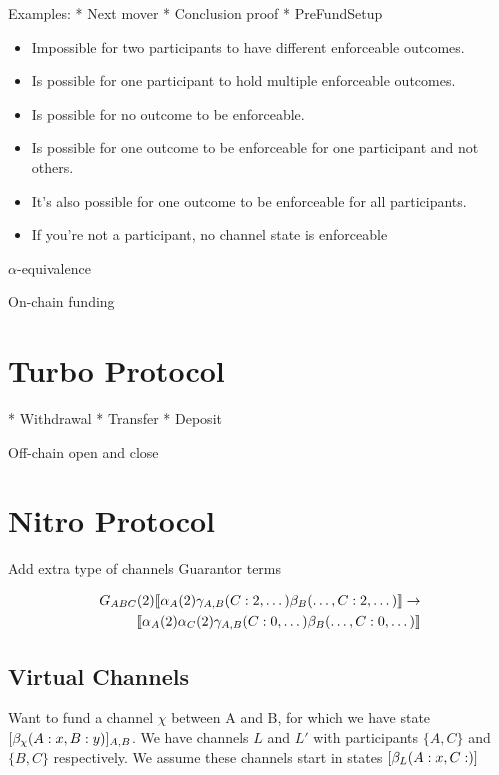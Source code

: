Examples:
* Next mover
* Conclusion proof
* PreFundSetup

\begin{itemize}
  \item Impossible for two participants to have different enforceable outcomes.
  \item Is possible for one participant to hold multiple enforceable outcomes.
  \item Is possible for no outcome to be enforceable.
  \item Is possible for one outcome to be enforceable for one participant and not others.
  \item It's also possible for one outcome to be enforceable for all participants.
  \item If you're not a participant, no channel state is enforceable
\end{itemize}

$\alpha$-equivalence

On-chain funding

\section{Turbo Protocol}

* Withdrawal
* Transfer
* Deposit

Off-chain open and close


\section{Nitro Protocol}

Add extra type of channels
Guarantor terms

\begin{align*}
G_{ABC}(2) \llbracket \alpha_A(2)\gamma_{A,B}(C:2, \dots)\beta_B(\dots, C:2, \dots) \rrbracket \rightarrow \\
\llbracket \alpha_A(2)\alpha_C(2)\gamma_{A,B}(C:0, \dots)\beta_B(\dots, C:0, \dots) \rrbracket
\end{align*}


\subsection{Virtual Channels}

Want to fund a channel $\chi$ between A and B, for which we have state $[\beta_\chi(A: x, B:y)]_{A,B}$. We have channels $L$ and $L'$ with participants $\{A, C\}$ and $\{B, C\}$ respectively. We assume these channels start in states $[\beta_L(A:x, C:)]$



